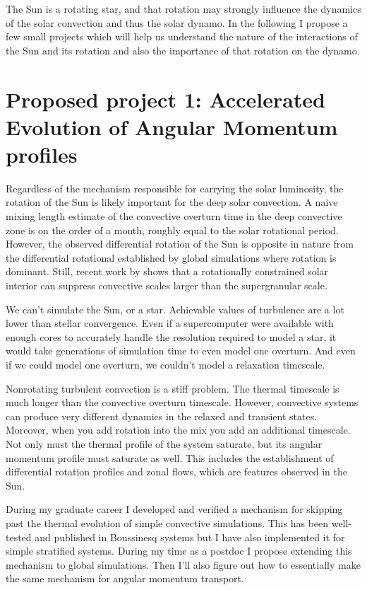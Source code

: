 \documentclass[aasms,12pt]{article}
\begin{document}
The Sun is a rotating star, and that rotation may strongly influence the dynamics of the solar convection and thus the solar dynamo.
In the following I propose a few small projects which will help us understand the nature of the interactions of the Sun and its rotation and also the importance of that rotation on the dynamo.



\section{Proposed project 1: Accelerated Evolution of Angular Momentum profiles}
Regardless of the mechanism responsible for carrying the solar luminosity, the rotation of the Sun is likely important for the deep solar convection.
A naive mixing length estimate of the convective overturn time in the deep convective zone is on the order of a month, roughly equal to the solar rotational period.
However, the observed differential rotation of the Sun is opposite in nature from the differential rotational established by global simulations where rotation is dominant.
Still, recent work by \citet{featherstone&hindman2016} shows that a rotationally constrained solar interior can suppress convective scales larger than the supergranular scale.

We can't simulate the Sun, or a star.
Achievable values of turbulence are a lot lower than stellar convergence.
Even if a supercomputer were available with enough cores to accurately handle the resolution required to model a star, it would take generations of simulation time to even model one overturn.
And even if we could model one overturn, we couldn't model a relaxation timescale.

Nonrotating turbulent convection is a stiff problem.
The thermal timescale is much longer than the convective overturn timescale.
However, convective systems can produce very different dynamics in the relaxed and transient states.
Moreover, when you add rotation into the mix you add an additional timescale.
Not only must the thermal profile of the system saturate, but its angular momentum profile must saturate as well.
This includes the establishment of differential rotation profiles and zonal flows, which are features observed in the Sun.

During my graduate career I developed and verified a mechanism for skipping past the thermal evolution of simple convective simulations.
This has been well-tested and published in Boussinesq systems but I have also implemented it for simple stratified systems.
During my time as a postdoc I propose extending this mechanism to global simulations.
Then I'll also figure out how to essentially make the same mechanism for angular momentum transport.
\end{document}
